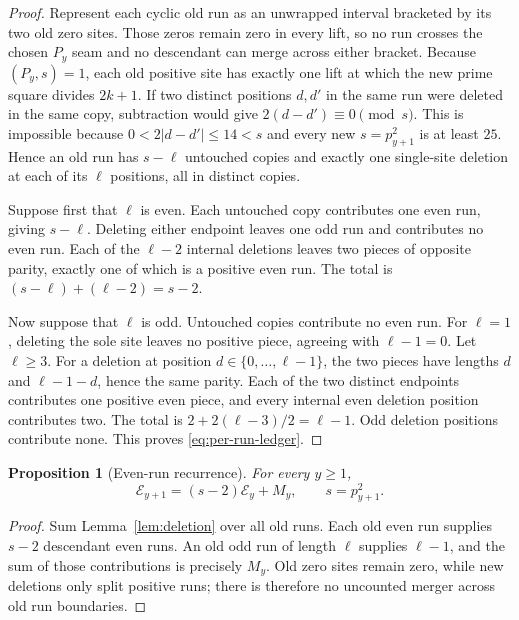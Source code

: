\documentclass[11pt]{article}
\newtheorem{proposition}[theorem]{Proposition}
\theoremstyle{definition}
\theoremstyle{remark}
\newcommand{\Ecal}{\mathcal E}
\begin{document}
\begin{proof}
Represent each cyclic old run as an unwrapped interval bracketed by its two
old zero sites.  Those zeros remain zero in every lift, so no run crosses
the chosen $P_y$ seam and no descendant can merge across either bracket.
Because $(P_y,s)=1$, each old positive site has exactly one lift at which
the new prime square divides $2k+1$.  If two distinct positions $d,d'$ in
the same run were deleted in the same copy, subtraction would give
$2(d-d')\equiv0\pmod s$.  This is impossible because
$0<2|d-d'|\le14<s$ and every new $s=p_{y+1}^2$ is at least $25$.  Hence an
old run has $s-\ell$ untouched copies and exactly one single-site deletion
at each of its $\ell$ positions, all in distinct copies.

Suppose first that $\ell$ is even.  Each untouched copy contributes one
even run, giving $s-\ell$.  Deleting either endpoint leaves one odd run and
contributes no even run.  Each of the $\ell-2$ internal deletions leaves two
pieces of opposite parity, exactly one of which is a positive even run.
The total is $(s-\ell)+(\ell-2)=s-2$.

Now suppose that $\ell$ is odd.  Untouched copies contribute no even run.
For $\ell=1$, deleting the sole site leaves no positive piece, agreeing
with $\ell-1=0$.  Let $\ell\ge3$.  For a deletion at position
$d\in\{0,\ldots,\ell-1\}$, the two pieces have lengths $d$ and
$\ell-1-d$, hence the same parity.  Each of the two distinct endpoints
contributes one positive even piece, and every internal even deletion
position contributes two.  The total is
$2+2(\ell-3)/2=\ell-1$.  Odd deletion positions contribute none.  This
proves \eqref{eq:per-run-ledger}.
\end{proof}

\begin{proposition}[Even-run recurrence]
\label{prop:even-recurrence}
For every $y\ge1$,
\begin{equation}
 \boxed{\displaystyle
 \Ecal_{y+1}=(s-2)\Ecal_y+M_y,\qquad s=p_{y+1}^2.}
 \label{eq:even-recurrence}
\end{equation}
\end{proposition}

\begin{proof}
Sum Lemma~\ref{lem:deletion} over all old runs.  Each old even run supplies
$s-2$ descendant even runs.  An old odd run of length $\ell$ supplies
$\ell-1$, and the sum of those contributions is precisely $M_y$.
Old zero sites remain zero, while new deletions only split positive runs;
there is therefore no uncounted merger across old run boundaries.
\end{proof}
\end{document}
